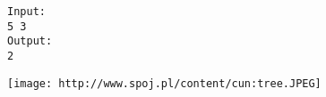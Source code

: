 \begin{verbatim}
Input:
5 3
Output:
2
\end{verbatim}
\texttt{[image: http://www.spoj.pl/content/cun:tree.JPEG]}